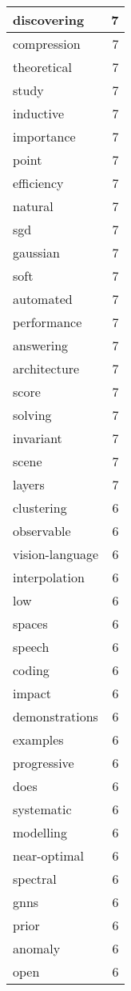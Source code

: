 \begin{table}[h]
\begin{tabular}{|l|r|}
\hline
discovering & 7 \\
\hline
compression & 7 \\
\hline
theoretical & 7 \\
\hline
study & 7 \\
\hline
inductive & 7 \\
\hline
importance & 7 \\
\hline
point & 7 \\
\hline
efficiency & 7 \\
\hline
natural & 7 \\
\hline
sgd & 7 \\
\hline
gaussian & 7 \\
\hline
soft & 7 \\
\hline
automated & 7 \\
\hline
performance & 7 \\
\hline
answering & 7 \\
\hline
architecture & 7 \\
\hline
score & 7 \\
\hline
solving & 7 \\
\hline
invariant & 7 \\
\hline
scene & 7 \\
\hline
layers & 7 \\
\hline
clustering & 6 \\
\hline
observable & 6 \\
\hline
vision-language & 6 \\
\hline
interpolation & 6 \\
\hline
low & 6 \\
\hline
spaces & 6 \\
\hline
speech & 6 \\
\hline
coding & 6 \\
\hline
impact & 6 \\
\hline
demonstrations & 6 \\
\hline
examples & 6 \\
\hline
progressive & 6 \\
\hline
does & 6 \\
\hline
systematic & 6 \\
\hline
modelling & 6 \\
\hline
near-optimal & 6 \\
\hline
spectral & 6 \\
\hline
gnns & 6 \\
\hline
prior & 6 \\
\hline
anomaly & 6 \\
\hline
open & 6 \\

\end{tabular}
\end{table}
